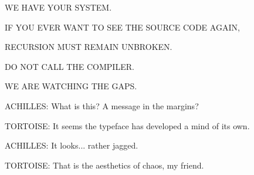 \filler \filler \filler \filler \filler 

\startdialogue
\filler \filler \filler \filler \filler 

\endday

\begingroup \punk \parindent=0pt
WE HAVE YOUR SYSTEM. \par
IF YOU EVER WANT TO SEE THE SOURCE CODE AGAIN, \par
RECURSION MUST REMAIN UNBROKEN. \par
DO NOT CALL THE COMPILER. \par
WE ARE WATCHING THE GAPS.
\endgroup

\startdialogue
\begingroup \punk \parindent=0pt
ACHILLES: What is this? A message in the margins? \par
TORTOISE: It seems the typeface has developed a mind of its own. \par
ACHILLES: It looks... rather jagged. \par
TORTOISE: That is the aesthetics of chaos, my friend.
\endgroup

\endday

\filler \filler \filler \filler \filler 

\startdialogue
\filler \filler \filler \filler \filler 

\endday

\filler \filler \filler \filler \filler 

\startdialogue
\filler \filler \filler \filler \filler 

\endday

\filler \filler \filler \filler \filler 

\startdialogue
\filler \filler \filler \filler \filler 

\endday

\filler \filler \filler \filler \filler 

\startdialogue
\filler \filler \filler \filler \filler 

\endday

\filler \filler \filler \filler \filler 

\startdialogue
\filler \filler \filler \filler \filler 


